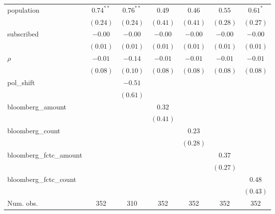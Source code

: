 \begin{table}[!h]
\begin{center}
\begin{tabular}{l c c c c c c }
population              & $0.74^{**}$  & $0.76^{**}$  & $0.49$       & $0.46$       & $0.55$       & $0.61^{*}$   \\
                        & $(0.24)$     & $(0.24)$     & $(0.41)$     & $(0.41)$     & $(0.28)$     & $(0.27)$     \\
subscribed              & $-0.00$      & $-0.00$      & $-0.00$      & $-0.00$      & $-0.00$      & $-0.00$      \\
                        & $(0.01)$     & $(0.01)$     & $(0.01)$     & $(0.01)$     & $(0.01)$     & $(0.01)$     \\
$\rho$                  & $-0.01$      & $-0.14$      & $-0.01$      & $-0.01$      & $-0.01$      & $-0.01$      \\
                        & $(0.08)$     & $(0.10)$     & $(0.08)$     & $(0.08)$     & $(0.08)$     & $(0.08)$     \\
pol\_shift              &              & $-0.51$      &              &              &              &              \\
                        &              & $(0.61)$     &              &              &              &              \\
bloomberg\_amount       &              &              & $0.32$       &              &              &              \\
                        &              &              & $(0.41)$     &              &              &              \\
bloomberg\_count        &              &              &              & $0.23$       &              &              \\
                        &              &              &              & $(0.28)$     &              &              \\
bloomberg\_fctc\_amount &              &              &              &              & $0.37$       &              \\
                        &              &              &              &              & $(0.27)$     &              \\
bloomberg\_fctc\_count  &              &              &              &              &              & $0.48$       \\
                        &              &              &              &              &              & $(0.43)$     \\
\midrule
Num. obs.               & 352          & 310          & 352          & 352          & 352          & 352          \\

\end{tabular}
\end{center}
\end{table}

